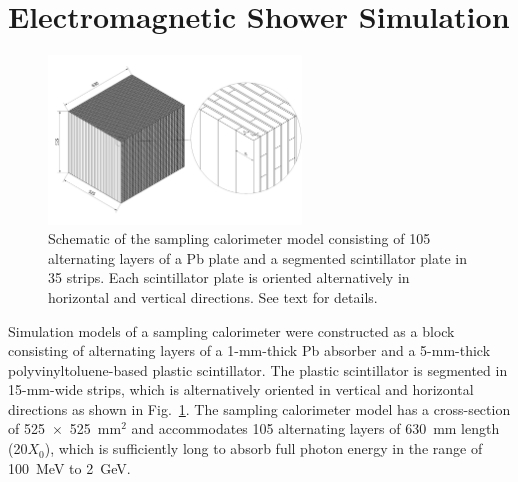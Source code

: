 \documentclass[preprint,12pt,times,a4paper]{elsarticle}
\begin{document}
\section{Electromagnetic Shower Simulation}
\label{sec:ems}

\begin{figure}[!hbt]
\centering
\includegraphics[width=0.6\textwidth]{figures/FullLayer_3.jpeg}
\caption{ Schematic of the sampling calorimeter model consisting of 105 alternating layers of a Pb plate and a segmented scintillator plate in 35 strips. Each scintillator plate is oriented alternatively in horizontal and vertical directions. See text for details. }
\label{fig:det_conf}
\end{figure}

Simulation models of a sampling calorimeter were constructed as a block consisting of alternating layers of a 1-mm-thick Pb absorber and a 5-mm-thick polyvinyltoluene-based plastic scintillator. The plastic scintillator is segmented in 15-mm-wide strips, which is alternatively oriented in vertical and horizontal directions as shown in Fig.~\ref{fig:det_conf}. The sampling calorimeter model has a cross-section of 525~$\times$~525~mm$^{2}$ and accommodates 105 alternating layers of 630~mm length (20$X_{0}$), which is sufficiently long to absorb full photon energy in the range of 100~MeV to 2~GeV. 
\end{document}
